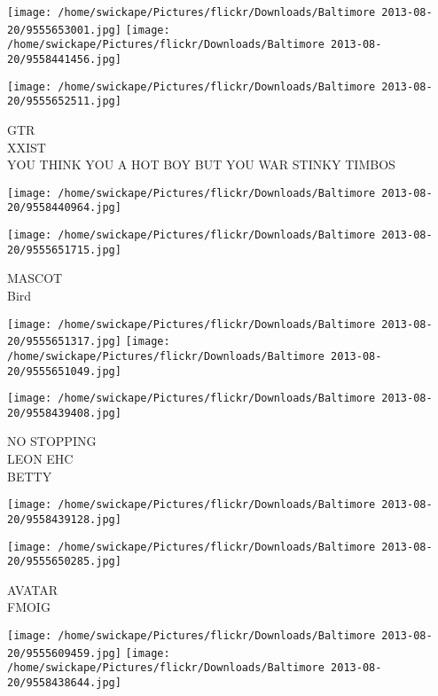\documentclass[10pt,letterpaper]{article}
\begin{document}
\texttt{[image: /home/swickape/Pictures/flickr/Downloads/Baltimore 2013-08-20/9555653001.jpg]}
\texttt{[image: /home/swickape/Pictures/flickr/Downloads/Baltimore 2013-08-20/9558441456.jpg]}

\texttt{[image: /home/swickape/Pictures/flickr/Downloads/Baltimore 2013-08-20/9555652511.jpg]}

GTR\\
XXIST\\
YOU THINK YOU A HOT BOY BUT YOU WAR STINKY TIMBOS\\
\pagebreak

\texttt{[image: /home/swickape/Pictures/flickr/Downloads/Baltimore 2013-08-20/9558440964.jpg]}

\vspace{0.25in}
\texttt{[image: /home/swickape/Pictures/flickr/Downloads/Baltimore 2013-08-20/9555651715.jpg]}

MASCOT\\
Bird\\
\pagebreak

\texttt{[image: /home/swickape/Pictures/flickr/Downloads/Baltimore 2013-08-20/9555651317.jpg]}
\texttt{[image: /home/swickape/Pictures/flickr/Downloads/Baltimore 2013-08-20/9555651049.jpg]}

\vspace{0.25in}
\texttt{[image: /home/swickape/Pictures/flickr/Downloads/Baltimore 2013-08-20/9558439408.jpg]}

NO STOPPING\\
LEON EHC\\
BETTY\\
\pagebreak

\texttt{[image: /home/swickape/Pictures/flickr/Downloads/Baltimore 2013-08-20/9558439128.jpg]}

\vspace{0.25in}
\texttt{[image: /home/swickape/Pictures/flickr/Downloads/Baltimore 2013-08-20/9555650285.jpg]}

AVATAR\\
FMOIG\\
\pagebreak

\texttt{[image: /home/swickape/Pictures/flickr/Downloads/Baltimore 2013-08-20/9555609459.jpg]}
\texttt{[image: /home/swickape/Pictures/flickr/Downloads/Baltimore 2013-08-20/9558438644.jpg]}
\end{document}
